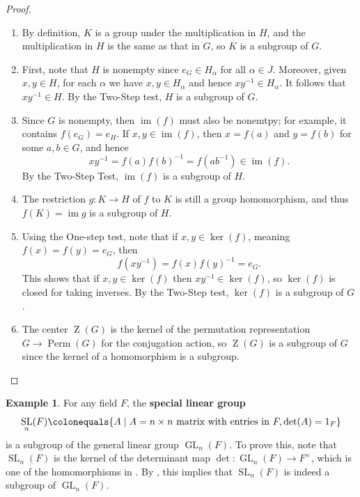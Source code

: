 \documentclass[12pt]{report}
\numberwithin{equation}{section}
\numberwithin{theorem}{chapter}
\theoremstyle{definition}
\newtheorem{example}[theorem]{Example}
\newtheorem*{basic properties}{Basic Properties}
\newtheorem*{Important Remark}{Important Remark}
\newcommand{\df}[1]{{\bf #1}\index{#1}}
\DeclareMathOperator{\GL}{GL}
\DeclareMathOperator{\SL}{SL}
\DeclareMathOperator{\Perm}{Perm}
\renewcommand{\ker}{\operatorname{ker}}
\DeclareMathOperator{\im}{im}
\DeclareMathOperator{\Zc}{Z}
\begin{document}
\begin{proof}$\,$

\vspace{-0.6em}
\begin{enumerate}[itemsep=-0.1em,label=(\alph*)]
	\item By definition, $K$ is a group under the multiplication in $H$, and the multiplication in $H$ is the same as that in $G$, so $K$ is a subgroup of $G$.
	\item First, note that $H$ is nonempty since $e_G \in H_\alpha$ for all $\alpha\in J$. Moreover, given $x,y\in H$, for each $\alpha$ we have $x,y \in H_\alpha$ and hence $xy^{-1} \in H_\alpha$. It follows that $xy^{-1} \in H$. By the Two-Step test, $H$ is a subgroup of $G$. 
	\item Since $G$ is nonempty, then $\im(f)$ must also be nonemtpy; for example, it contains $f(e_G) = e_H$. If $x,y \in \im(f)$, then $x = f(a)$ and $y = f(b)$ for some $a,b \in G$, and hence 
	$$xy^{-1} =f(a)f(b)^{-1} = f(ab^{-1}) \in \im(f).$$
	By the Two-Step Test, $\im(f)$ is a subgroup of $H$. 
	
	\item The restriction $g\!: K \to H$ of $f$ to $K$ is still a group homomorphism, and thus $f(K) = \im g$ is a subgroup of $H$. 
	
	\item Using the One-step test, note that if $x, y \in \ker(f)$, meaning $f(x)=f(y)=e_G$, then 
	$$f(xy^{-1})=f(x)f(y)^{-1}=e_G.$$ 
	This shows that if $x,y\in \ker(f)$ then $xy^{-1}\in \ker(f)$, so $\ker(f)$ is closed for taking inverses. By the Two-Step test, $\ker(f)$ is a subgroup of $G$.
	\item The center $\Zc(G)$ is the kernel of the permutation representation $G\to \Perm(G)$ for the conjugation action, so $\Zc(G)$ is a subgroup of $G$ since the kernel of a homomorphism is a subgroup.\qedhere 
\end{enumerate} 
\end{proof}




\begin{example}
For any field $F$, the \df{special linear group}
$$\SL_n(F) \colonequals \{A \mid A = n\times n \text{ matrix with entries in } F, \det(A)=1_F\}$$
is a subgroup of the general linear group $\GL_n(F)$. To prove this, note that $\SL_n(F)$ is the kernel of the determinant map $\det\!:\GL_n(F)\to F^\times$, which is one of the homomorphisms in . By , this implies that $\SL_n(F)$ is indeed a subgroup of $\GL_n(F)$.
\end{example}
\end{document}
